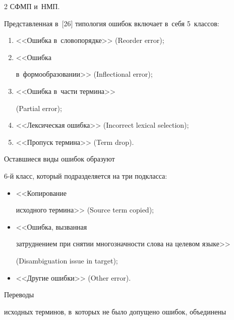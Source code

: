 \begin{multicols}{2}
СФМП и~НМП.


  


  Представленная в~[26] типология ошибок включает в~себя 5~классов: 


\begin{enumerate}[(1)]


\item <<Ошибка в~словопорядке>> (Reorder error);\\[-10pt] 


\item <<Ошибка 


в~формообразовании>> (Inflectional error);\\[-10pt] 


\item <<Ошибка в~части термина>> 


(Partial error); \\[-10pt]


\item <<Лексическая ошибка>> (Incorrect lexical selection); \\[-10pt]


\item <<Пропуск термина>> (Term drop).


\end{enumerate}


 Оставшиеся виды ошибок образуют 


6-й класс, который подразделяется на три подкласса: 


\begin{itemize}


\item <<Копирование 


исходного термина>> (Source term copied); \\[-10pt]


\item <<Ошибка, вызванная 


затруднением при снятии многозначности слова на целевом языке>> 


(Disambiguation issue in target); 


\item <<Другие ошибки>> (Other error).


\end{itemize}





 Переводы 


исходных терминов, в~которых не было допущено ошибок, объединены 



\end{multicols}
